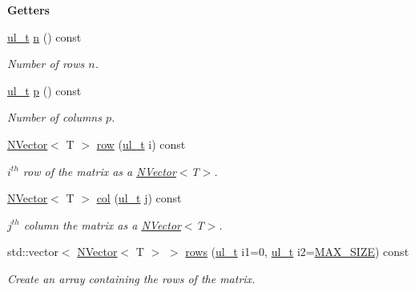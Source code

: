 \begin{Indent}\textbf{ Getters}\par
\begin{DoxyCompactItemize}
\item 
\mbox{\hyperlink{typedef_8h_a1b140a2034db3f5dfe18a987745df43a}{ul\+\_\+t}} \mbox{\hyperlink{class_n_p_matrix_afc181b7652d9427125c72c38d7c1498d}{n}} () const
\begin{DoxyCompactList}\small\item\em Number of rows $ n $. \end{DoxyCompactList}\item 
\mbox{\hyperlink{typedef_8h_a1b140a2034db3f5dfe18a987745df43a}{ul\+\_\+t}} \mbox{\hyperlink{class_n_p_matrix_a3beee8acb5babf62d2b4f212ac5d18e8}{p}} () const
\begin{DoxyCompactList}\small\item\em Number of columns $ p $. \end{DoxyCompactList}\item 
\mbox{\hyperlink{class_n_vector}{N\+Vector}}$<$ T $>$ \mbox{\hyperlink{class_n_p_matrix_a99ae2d8850ecdb33fbd9a71804ab4ea7}{row}} (\mbox{\hyperlink{typedef_8h_a1b140a2034db3f5dfe18a987745df43a}{ul\+\_\+t}} i) const
\begin{DoxyCompactList}\small\item\em $ i^{th} $ row of the matrix as a {\ttfamily \mbox{\hyperlink{class_n_vector}{N\+Vector}}$<$T$>$}. \end{DoxyCompactList}\item 
\mbox{\hyperlink{class_n_vector}{N\+Vector}}$<$ T $>$ \mbox{\hyperlink{class_n_p_matrix_aa137db97da518f1dfb69e7eb8fa1b94d}{col}} (\mbox{\hyperlink{typedef_8h_a1b140a2034db3f5dfe18a987745df43a}{ul\+\_\+t}} j) const
\begin{DoxyCompactList}\small\item\em $ j^{th} $ column the matrix as a {\ttfamily \mbox{\hyperlink{class_n_vector}{N\+Vector}}$<$T$>$}. \end{DoxyCompactList}\item 
std\+::vector$<$ \mbox{\hyperlink{class_n_vector}{N\+Vector}}$<$ T $>$ $>$ \mbox{\hyperlink{class_n_p_matrix_add861e9e1df81af2546c3eab1fd40d51}{rows}} (\mbox{\hyperlink{typedef_8h_a1b140a2034db3f5dfe18a987745df43a}{ul\+\_\+t}} i1=0, \mbox{\hyperlink{typedef_8h_a1b140a2034db3f5dfe18a987745df43a}{ul\+\_\+t}} i2=\mbox{\hyperlink{_n_vector_8h_a0592dba56693fad79136250c11e5a7fe}{M\+A\+X\+\_\+\+S\+I\+ZE}}) const
\begin{DoxyCompactList}\small\item\em Create an array containing the rows of the matrix. \end{DoxyCompactList}\item 

\end{DoxyCompactItemize}
\end{Indent}

